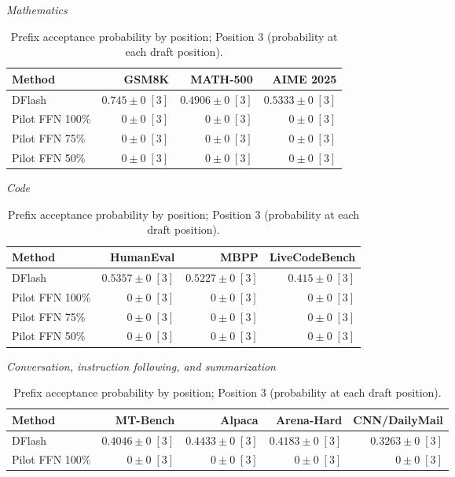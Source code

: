 \begin{table}[!htp]
\centering\small
\setlength{\tabcolsep}{3pt}
\caption{Prefix acceptance probability by position; Position 3 (probability at each draft position).}
\label{tab:appendix-metric-prefix-survival-3}
\textit{Mathematics}\par\smallskip
\begin{tabular}{@{}>{\raggedright\arraybackslash}p{3.7cm}rrr@{}}
\toprule
Method & GSM8K & MATH-500 & AIME 2025 \\
\midrule
DFlash & \(\mathbf{0.745} \pm 0\;[3]\) & \(\mathbf{0.4906} \pm 0\;[3]\) & \(\mathbf{0.5333} \pm 0\;[3]\) \\
Pilot FFN 100\% & \(0 \pm 0\;[3]\) & \(0 \pm 0\;[3]\) & \(0 \pm 0\;[3]\) \\
Pilot FFN 75\% & \(0 \pm 0\;[3]\) & \(0 \pm 0\;[3]\) & \(0 \pm 0\;[3]\) \\
Pilot FFN 50\% & \(0 \pm 0\;[3]\) & \(0 \pm 0\;[3]\) & \(0 \pm 0\;[3]\) \\
\bottomrule
\end{tabular}\par\medskip
\textit{Code}\par\smallskip
\begin{tabular}{@{}>{\raggedright\arraybackslash}p{3.7cm}rrr@{}}
\toprule
Method & HumanEval & MBPP & LiveCodeBench \\
\midrule
DFlash & \(\mathbf{0.5357} \pm 0\;[3]\) & \(\mathbf{0.5227} \pm 0\;[3]\) & \(\mathbf{0.415} \pm 0\;[3]\) \\
Pilot FFN 100\% & \(0 \pm 0\;[3]\) & \(0 \pm 0\;[3]\) & \(0 \pm 0\;[3]\) \\
Pilot FFN 75\% & \(0 \pm 0\;[3]\) & \(0 \pm 0\;[3]\) & \(0 \pm 0\;[3]\) \\
Pilot FFN 50\% & \(0 \pm 0\;[3]\) & \(0 \pm 0\;[3]\) & \(0 \pm 0\;[3]\) \\
\bottomrule
\end{tabular}\par\medskip
\textit{Conversation, instruction following, and summarization}\par\smallskip
\begin{tabular}{@{}>{\raggedright\arraybackslash}p{3.7cm}rrrr@{}}
\toprule
Method & MT-Bench & Alpaca & Arena-Hard & CNN/DailyMail \\
\midrule
DFlash & \(\mathbf{0.4046} \pm 0\;[3]\) & \(\mathbf{0.4433} \pm 0\;[3]\) & \(\mathbf{0.4183} \pm 0\;[3]\) & \(\mathbf{0.3263} \pm 0\;[3]\) \\
Pilot FFN 100\% & \(0 \pm 0\;[3]\) & \(0 \pm 0\;[3]\) & \(0 \pm 0\;[3]\) & \(0 \pm 0\;[3]\) \\

\end{tabular}
\end{table}

